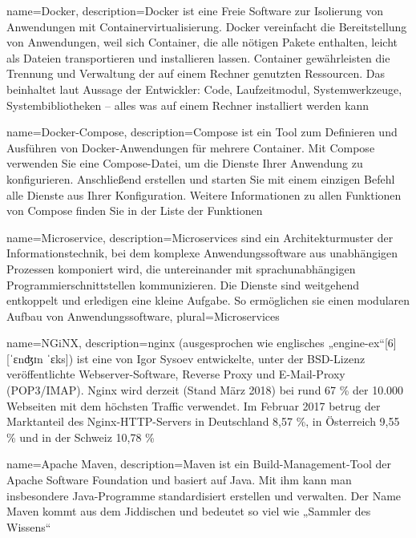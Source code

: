 {
    name=Docker,
    description={Docker ist eine Freie Software zur Isolierung von Anwendungen mit Containervirtualisierung. Docker vereinfacht die Bereitstellung von Anwendungen, weil sich Container, die alle nötigen Pakete enthalten, leicht als Dateien transportieren und installieren lassen. Container gewährleisten die Trennung und Verwaltung der auf einem Rechner genutzten Ressourcen. Das beinhaltet laut Aussage der Entwickler: Code, Laufzeitmodul, Systemwerkzeuge, Systembibliotheken – alles was auf einem Rechner installiert werden kann}
}

{
    name=Docker-Compose,
    description={Compose ist ein Tool zum Definieren und Ausführen von Docker-Anwendungen für mehrere Container. Mit Compose verwenden Sie eine Compose-Datei, um die Dienste Ihrer Anwendung zu konfigurieren. Anschließend erstellen und starten Sie mit einem einzigen Befehl alle Dienste aus Ihrer Konfiguration. Weitere Informationen zu allen Funktionen von Compose finden Sie in der Liste der Funktionen}
}

{
    name=Microservice,
    description={Microservices sind ein Architekturmuster der Informationstechnik, bei dem komplexe Anwendungssoftware aus unabhängigen Prozessen komponiert wird, die untereinander mit sprachunabhängigen Programmierschnittstellen kommunizieren. Die Dienste sind weitgehend entkoppelt und erledigen eine kleine Aufgabe. So ermöglichen sie einen modularen Aufbau von Anwendungssoftware},
    plural={Microservices}
}

{
    name=NGiNX,
    description={nginx (ausgesprochen wie englisches „engine-ex“[6] [ˈɛnʤɪn ˈɛks]) ist eine von Igor Sysoev entwickelte, unter der BSD-Lizenz veröffentlichte Webserver-Software, Reverse Proxy und E-Mail-Proxy (POP3/IMAP). Nginx wird derzeit (Stand März 2018) bei rund 67 \% der 10.000 Webseiten mit dem höchsten Traffic verwendet. Im Februar 2017 betrug der Marktanteil des Nginx-HTTP-Servers in Deutschland 8,57 \%, in Österreich 9,55 \% und in der Schweiz 10,78 \%}
}

{
    name=Apache Maven,
    description={Maven ist ein Build-Management-Tool der Apache Software Foundation und basiert auf Java. Mit ihm kann man insbesondere Java-Programme standardisiert erstellen und verwalten. Der Name Maven kommt aus dem Jiddischen und bedeutet so viel wie „Sammler des Wissens“}
}

